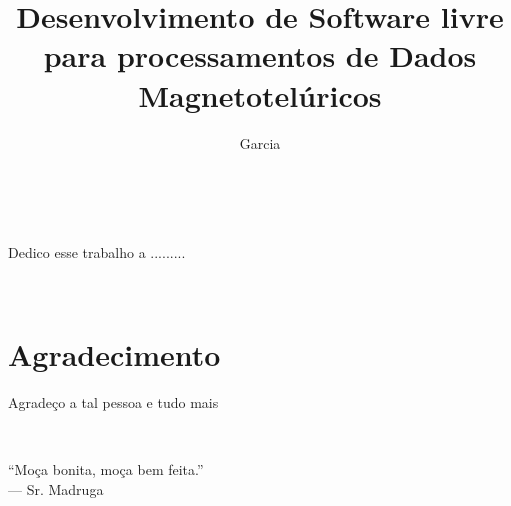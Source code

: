 \documentclass[csgeo,tcc, twoside]{unipampa}
\title{Desenvolvimento de Software livre para processamentos de Dados Magnetotelúricos}
\author{Garcia}{Patrick Rogger}
\begin{document}
\maketitle
\newpage\

%




    \begin{dedicatoria} 
        Dedico esse trabalho a .........
    \end{dedicatoria}








\newpage\
\chapter*{Agradecimento}

Agradeço a tal pessoa e tudo mais







	\newpage\
	\begin{epigrafe}
		``Moça bonita, moça bem feita.''\\
		--- Sr. Madruga
	\end{epigrafe}








    \newpage\
    \begin{abstract} 
        
    \end{abstract}
\end{document}
